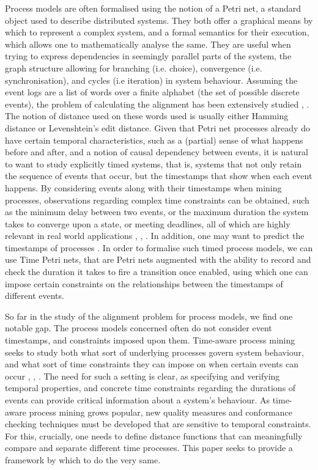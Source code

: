 \documentclass{article}
\theoremstyle{Definition}
\theoremstyle{definition}
\begin{document}
		Process models are often formalised using the notion of a Petri net, a standard object used to describe  distributed systems. 
		They both offer a graphical means by which to represent a complex system, and a formal semantics for their execution, which allows one to mathematically analyse the same. 
		They are useful when trying to express dependencies in seemingly parallel parts of the system, the graph structure allowing for branching (i.e. choice), convergence (i.e. synchronisation), and cycles (i.e iteration) in system behaviour. 
		Assuming the event logs are a list of words over a finite alphabet (the set of possible discrete events), the problem of calculating the alignment has been extensively studied \cite{Adriansyah2014AligningOA}, \cite{BCC21}. 
		The notion of distance used on these words used is usually either Hamming distance or Levenshtein's edit distance. 
		Given that Petri net processes already do have certain temporal characteristics, such as a (partial) sense of what happens before and after, and a notion of causal dependency between events, it is natural to want to study explicitly timed systems, that is, systems that not only retain the sequence of events that occur, but the timestamps that show when each event happens. 
		By considering events along with their timestamps when mining processes, observations regarding complex time constraints can be obtained, such as the minimum delay between two events, or the maximum duration the system takes to converge upon a state, or meeting deadlines, all of which are highly relevant in real world applications \cite{Cheikhrouhou2014TheTP}, \cite{Eder1999TimeCI}, \cite{inbook}. 
		In addition, one may want to predict the timestamps of processes \cite{SSA11}. 
		In order to formalise such timed process models, we can use Time Petri nets, that are Petri nets augmented with the ability to record and check the duration it takes to fire a transition once enabled, using which one can impose certain constraints on the relationships between the timestamps of different events. 
		
		So far in the study of the alignment problem for process models, we find one notable gap. 
		The process models concerned often do not consider event timestamps, and constraints imposed upon them. 
		Time-aware process mining seeks to study both what sort of underlying processes govern system behaviour, and what sort of time constraints they can impose on when certain events can occur \cite{RMAW13}, \cite{CRHA20}, \cite{AS21}. 
		The need for such a setting is clear, as specifying and verifying temporal properties, and concrete time constraints regarding the durations of events can provide critical information about a system's behaviour. 
		As time-aware process mining grows popular, new quality measures and conformance checking techniques must be developed that are sensitive to temporal constraints. 
		For this, crucially, one needs to define distance functions that can meaningfully compare and separate different time processes. 
		This paper seeks to provide a framework by which to do the very same.
		
\end{document}
